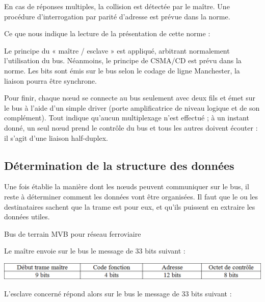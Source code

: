 \documentclass[10pt]{article}
\begin{document}
En cas de réponses multiples, la collision est détectée par le maître. Une procédure d’interrogation par parité d’adresse est prévue dans la norme.


Ce que nous indique la lecture de la présentation de cette norme :

Le principe du « maître / esclave » est appliqué, arbitrant normalement l’utilisation du bus. Néanmoins, le principe de CSMA/CD est prévu dans la norme.
Les bits sont émis sur le bus selon le codage de ligne Manchester, la liaison pourra être synchrone.

Pour finir, chaque nœud se connecte au bus seulement avec deux fils et émet sur le bus à l’aide d’un simple driver (porte amplificatrice de niveau logique et de son complément). Tout indique qu’aucun multiplexage n’est effectué ; à un instant donné, un seul nœud prend le contrôle du bus et tous les autres doivent écouter : il s’agit d’une liaison half-duplex.

\subsection{Détermination de la structure des données}
Une fois établie la manière dont les nœuds peuvent communiquer sur le bus, il reste à déterminer comment les données vont être organisées. 
Il faut que le ou les destinataires sachent que la trame est pour eux, et qu’ils puissent en extraire les données utiles.

\begin{exemple}
Bus de terrain MVB pour réseau ferroviaire
\end{exemple}

Le maître envoie sur le bus le message de 33 bits suivant :

\begin{center}
\includegraphics[width=.95\textwidth]{images/fig_25}
\end{center}


L'esclave concerné répond alors sur le bus le message de 33 bits suivant :

\end{document}
